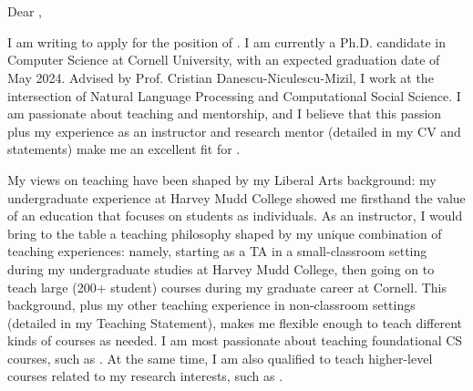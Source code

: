 \documentclass[12pt]{letter}
\begin{document}
\signature{Jonathan P. Chang}
\begin{letter}{
\department \\
\schoolnamelong \\
\schooladdress
}

\opening{
    Dear ,
}

I am writing to apply for the position of \position.
I am currently a Ph.D. candidate in Computer Science at Cornell University, with an expected graduation date of May 2024.
Advised by Prof. Cristian Danescu-Niculescu-Mizil, I work at the intersection of Natural Language Processing and Computational Social Science.
I am passionate about teaching and mentorship, and I believe that this passion plus my experience as an instructor and research mentor (detailed in my CV and statements) make me an excellent fit for \schoolname.

\ifliberalarts
My views on teaching have been shaped by my Liberal Arts background: my undergraduate experience at Harvey Mudd College showed me firsthand the value of an education that focuses on students as individuals.
\coverteachingpara
\else
As an instructor, I would bring to the table a teaching philosophy shaped by my unique combination of teaching experiences: namely, starting as a TA in a small-classroom setting during my undergraduate studies at Harvey Mudd College, then going on to teach large (200+ student) courses during my graduate career at Cornell.
This background, plus my other teaching experience in non-classroom settings (detailed in my Teaching Statement), makes me flexible enough to teach different kinds of courses as needed.
I am most passionate about teaching foundational CS courses, such as \schoolintrocourses.
At the same time, I am also qualified to teach higher-level courses related to my research interests, such as \schooladvcourses.
\fi


\end{letter}
\end{document}
